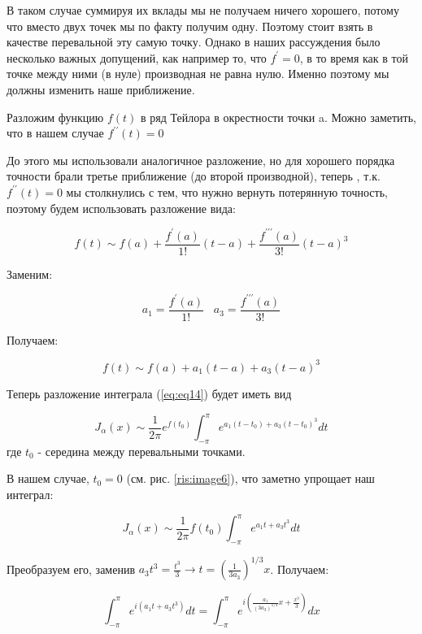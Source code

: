 \documentclass[14pt]{extarticle}
\begin{document}
В таком случае суммируя их вклады мы не получаем ничего хорошего, потому что вместо двух точек мы по факту получим одну. Поэтому стоит взять в качестве перевальной эту самую точку. Однако в наших рассуждения было несколько важных допущений, как например то, что $f^{\prime} = 0$, в то время как в той точке между ними (в нуле) производная не равна нулю. Именно поэтому мы должны изменить наше приближение.

Разложим функцию $f(t)$ в ряд Тейлора в окрестности точки a. Можно заметить, что в нашем случае  $f^{\prime\prime}(t) = 0$

До этого мы использовали аналогичное разложение, но для хорошего порядка точности брали третье приближение (до второй производной), теперь , т.к. $f^{\prime\prime}(t) = 0$ мы столкнулись с тем, что нужно вернуть потерянную точность, поэтому будем использовать разложение вида:

\begin{equation}\label{eq:eq17}
f(t) \sim f(a) + \frac{f^{\prime}(a)}{1!}(t-a) + \frac{f^{\prime\prime\prime}(a)}{3!}(t-a)^3
\end{equation}

Заменим:

$$
a_1 = \frac{f^{\prime}(a)}{1!} \;\;\; a_3 = \frac{f^{\prime\prime\prime}(a)}{3!}
$$

Получаем:
  
\begin{equation}\label{eq:eq18}
f(t) \sim f(a) + a_1(t-a) + a_3(t-a)^3
\end{equation}
  
Теперь разложение интеграла (\ref{eq:eq14}) будет иметь вид

\begin{equation}\nonumber
J_\alpha(x) \sim \frac{1}{2\pi} e^{f(t_0)} \int_{-\pi}^{\pi}e^{a_1(t-t_0) + a_3(t-t_0)^3}dt
\end{equation}
где $t_0$ - середина между перевальными точками.

В нашем случае, $t_0=0$ (см. рис. \ref{ris:image6}), что заметно упрощает наш интеграл:

\begin{equation}\nonumber
J_\alpha(x) \sim \frac{1}{2\pi} f(t_0) \int_{-\pi}^{\pi}e^{a_1 t + a_3 t^3}dt
\end{equation}
  
Преобразуем его, заменив $a_3t^3 = \frac{t^3}{3} \rightarrow t = \left(\frac{1}{3a_3}\right)^{1/3}x$. Получаем:

\begin{equation}\nonumber
\int_{-\pi}^{\pi}e^{i\left(a_1 t + a_3 t^3\right)}dt = \int_{-\pi}^{\pi}e^{i\left(\frac{a_1}{(3a_3)^{1/3}}x + \frac{x^3}{3}\right)}dx 
\end{equation}
\end{document}
